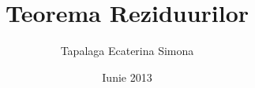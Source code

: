 \documentclass[10pt,a4paper]{article}
\begin{document}
\title{Teorema Reziduurilor}
\author{Tapalaga Ecaterina Simona}
\date{Iunie 2013}




%  
%  
 
\end{document}
